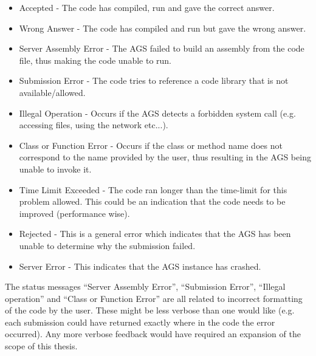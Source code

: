 \begin{itemize}
	\item Accepted - The code has compiled, run and gave the correct answer.
	\item Wrong Answer - The code has compiled and run but gave the wrong answer.
	\item Server Assembly Error - The AGS failed to build an assembly from the code file, thus making the code unable to run.
	\item Submission Error - The code tries to reference a code library that is not available/allowed.
	\item Illegal Operation - Occurs if the AGS detects a forbidden system call (e.g. accessing files, using the network etc...).
	\item Class or Function Error - Occurs if the class or method name does not correspond to the name provided by the user, thus resulting in the AGS being unable to invoke it.
	\item Time Limit Exceeded - The code ran longer than the time-limit for this problem allowed. This could be an indication that the code needs to be improved (performance wise).
	\item Rejected - This is a general error which indicates that the AGS has been unable to determine why the submission failed.
	\item Server Error - This indicates that the AGS instance has crashed.
\end{itemize}

The status messages ``Server Assembly Error'', ``Submission Error'', ``Illegal operation'' and ``Class or Function Error'' are all related to incorrect formatting of the code by the user. These might be less verbose than one would like (e.g. each submission could have returned exactly where in the code the error occurred). Any more verbose feedback would have required an expansion of the scope of this thesis.

